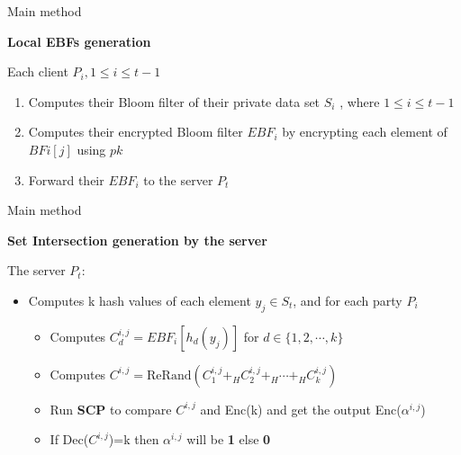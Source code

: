 \begin{frame}{Main method}

    \textbf{Local EBFs generation}

    \vspace{0.25cm} 

    Each client $P_i, 1 \leq i \leq t-1$
    \begin{enumerate}
        \item Computes their Bloom filter of their private data set $S_i$ ,
        where $1 \leq i \leq t-1$
        \item Computes their encrypted Bloom filter ${EBF_i}$ by encrypting
        each element of $BFi[j]$ using $pk$
        \item  Forward their $EBF_i$ to the server $P_t$
    \end{enumerate}


\end{frame}

\begin{frame}{Main method}

    \textbf{Set Intersection generation by the server}

    \vspace{0.5cm}
    The server $P_t$:
    \begin{itemize}
        \item Computes k hash values of each element $y_j \in S_t$, and for each party $P_i$
        \begin{itemize}
            \item Computes $C_d^{i,j} = EBF_i[h_d(y_j)]$ for $d \in \{1,2,\cdots,k\}$
            \item Computes $C^{i,j} = \text{ReRand}(C_1^{i,j}+_HC_2^{i,j}+_H\cdots +_H C_k^{i,j})$
            \item Run \textbf{SCP} to compare $C^{i,j}$ and Enc(k) and get the output Enc($\alpha^{i,j}$)
            \item If Dec($C^{i,j}$)=k then $\alpha^{i,j}$ will be \textbf{1} else \textbf{0}
        \end{itemize}
    \end{itemize}

\end{frame}

